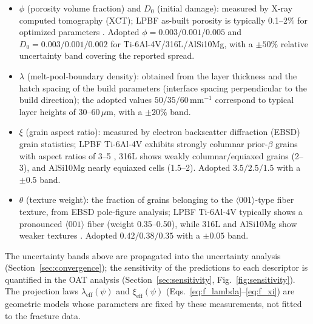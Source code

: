 \documentclass[twocolumn]{sagej}
\begin{document}
\begin{itemize}
    \item $\phi$ (porosity volume fraction) and $D_0$ (initial damage): measured by X-ray computed tomography (XCT); LPBF as-built porosity is typically 0.1--2\% for optimized parameters \cite{liu2022phase}. Adopted $\phi = 0.003/0.001/0.005$ and $D_0 = 0.003/0.001/0.002$ for Ti-6Al-4V/316L/AlSi10Mg, with a $\pm50\%$ relative uncertainty band covering the reported spread.
    \item $\lambda$ (melt-pool-boundary density): obtained from the layer thickness and the hatch spacing of the build parameters (interface spacing perpendicular to the build direction); the adopted values $50/35/60$\,mm$^{-1}$ correspond to typical layer heights of 30--60\,$\mu$m, with a $\pm20\%$ band.
    \item $\xi$ (grain aspect ratio): measured by electron backscatter diffraction (EBSD) grain statistics; LPBF Ti-6Al-4V exhibits strongly columnar prior-$\beta$ grains with aspect ratios of 3--5 \cite{carroll2015anisotropic}, 316L shows weakly columnar/equiaxed grains (2--3), and AlSi10Mg nearly equiaxed cells (1.5--2). Adopted $3.5/2.5/1.5$ with a $\pm0.5$ band.
    \item $\theta$ (texture weight): the fraction of grains belonging to the $\langle001\rangle$-type fiber texture, from EBSD pole-figure analysis; LPBF Ti-6Al-4V typically shows a pronounced $\langle001\rangle$ fiber (weight 0.35--0.50), while 316L and AlSi10Mg show weaker textures \cite{carroll2015anisotropic,jaskari2021materials_316l}. Adopted $0.42/0.38/0.35$ with a $\pm0.05$ band.
\end{itemize}

The uncertainty bands above are propagated into the uncertainty analysis (Section~\ref{sec:convergence}); the sensitivity of the predictions to each descriptor is quantified in the OAT analysis (Section~\ref{sec:sensitivity}, Fig.~\ref{fig:sensitivity}). The projection laws $\lambda_{\mathrm{eff}}(\psi)$ and $\xi_{\mathrm{eff}}(\psi)$ (Eqs.~\eqref{eq:f_lambda}--\eqref{eq:f_xi}) are geometric models whose parameters are fixed by these measurements, not fitted to the fracture data.
\end{document}
